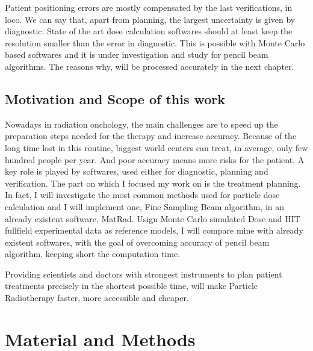\documentclass[12pt, a4paper, twoside]{book}
\begin{document}
Patient positioning errors are mostly compensated by the last verifications, in loco.
We can say that, apart from planning, the largest uncertainty is given by diagnostic.
State of the art dose calculation softwares should at least keep the resolution smaller than the error in diagnostic. This is possible with Monte Carlo based softwares and it is under investigation and study for pencil beam algorithms. The reasons why, will be processed accurately in the next chapter.



\section{Motivation and Scope of this work} 
Nowadays in radiation onchology, the main challenges are to speed up the preparation steps needed for the therapy and increase accuracy. Because of the long time lost in this routine, biggest world centers can treat, in average, only few hundred people per year. And poor accuracy means more risks for the patient.
A key role is played by softwares, used either for diagnostic, planning and verification.
The part on which I focused my work on is the treatment planning. In fact, I will investigate the most common methods used for particle dose calculation and I will implement one, Fine Sampling Beam algorithm, in an already existent software, MatRad. 
Usign Monte Carlo simulated Dose and HIT fullfield experimental data as reference models, I will compare mine with already existent softwares, with the goal of overcoming accuracy of pencil beam algorithm, keeping short the computation time.  

Providing scientists and doctors with strongest instruments to plan patient treatments precisely in the shortest possible time, will make Particle Radiotherapy faster, more accessible and cheaper.









\chapter{Material and Methods} %
\end{document}
